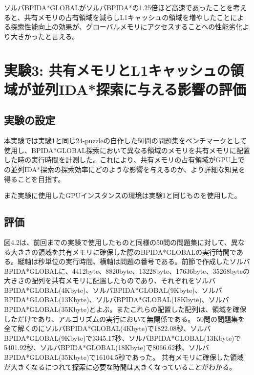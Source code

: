 \documentclass[a4paper,11pt,oneside,openany]{jsbook}
\begin{document}
ソルバBPIDA*GLOBALがソルバBPIDA*の1.25倍ほど高速であったことを考えると、共有メモリの占有領域を減らしL1キャッシュの領域を増やしたことによる探索性能向上の効果が、グローバルメモリにアクセスすることへの性能劣化より大きかったと言える。






\section{実験3: 共有メモリとL1キャッシュの領域が並列IDA*探索に与える影響の評価}


\subsection{実験の設定}
本実験では実験1と同じ24-puzzleの自作した50問の問題集をベンチマークとして使用し、BPIDA*GLOBAL探索において異なる領域のメモリを共有メモリに配置した時の実行時間を計測した。これにより、共有メモリの占有領域がGPU上での並列IDA*探索の探索効率にどのような影響を与えるのか、より詳細な知見を得ることを目指す。

また実験に使用したGPUインスタンスの環境は実験1と同じものを使用した。


\subsection{評価}
図4.2は、前回までの実験で使用したものと同様の50問の問題集に対して、異なる大きさの領域を共有メモリに確保した際のBPIDA*GLOBALの実行時間である。縦軸は秒単位の実行時間、横軸は問題の番号である。前節で作成したソルバBPIDA*GLOBALに、4412byte、8820byte、13228byte、17636byte、35268byteの大きさの配列を共有メモリに配置したものであり、それぞれをソルバBPIDA*GLOBAL(4Kbyte)、ソルバBPIDA*GLOBAL(9Kbyte)、ソルバBPIDA*GLOBAL(13Kbyte)、ソルバBPIDA*GLOBAL(18Kbyte)、ソルバBPIDA*GLOBAL(35Kbyte)とよぶ。またこれらの配置した配列は、領域を確保しただけであり、アルゴリズムの実行において無関係である。
50問の問題集を全て解くのにソルバBPIDA*GLOBAL(4Kbyte)で1822.08秒、ソルバBPIDA*GLOBAL(9Kbyte)で3345.17秒、ソルバBPIDA*GLOBAL(13Kbyte)で5401.92秒、ソルバBPIDA*GLOBAL(18Kbyte)で8066.62秒、ソルバBPIDA*GLOBAL(35Kbyte)で16104.5秒であった。
共有メモリに確保した領域が大きくなるにつれて探索に必要な時間は大きくなっていることがわかる。
\end{document}
